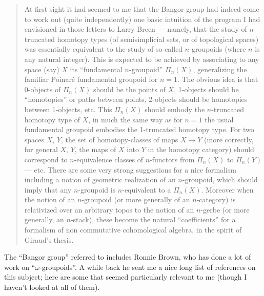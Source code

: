 \documentclass{article}
\begin{document}
\begin{quote}
At first sight it had seemed to me that the Bangor group had indeed come
to work out (quite independently) one basic intuition of the program I
had envisioned in those letters to Larry Breen --- namely, that the
study of \(n\)-truncated homotopy types (of semisimplicial sets, or of
topological spaces) was essentially equivalent to the study of so-called
\(n\)-groupoids (where \(n\) is any natural integer). This is expected
to be achieved by associating to any space (say) \(X\) its ``fundamental
\(n\)-groupoid'' \(\Pi_n(X)\), generalizing the familiar Poinar\'e
fundamental groupoid for \(n = 1\). The obvious idea is that 0-objects
of \(\Pi_n(X)\) should be the points of \(X\), 1-objects should be
``homotopies'' or paths between points, 2-objects should be homotopies
between 1-objects, etc. This \(\Pi_n(X)\) should embody the
\(n\)-truncated homotopy type of \(X\), in much the same way as for
\(n = 1\) the usual fundamental groupoid embodies the 1-truncated
homotopy type. For two spaces \(X\), \(Y\), the set of homotopy-classes
of maps \(X \to Y\) (more correctly, for general \(X\), \(Y\), the maps
of \(X\) into \(Y\) in the homotopy category) should correspond to
\(n\)-equivalence classes of \(n\)-functors from \(\Pi_n(X)\) to
\(\Pi_n(Y)\) --- etc. There are some very strong suggestions for a nice
formalism including a notion of geometric realization of an
\(n\)-groupoid, which should imply that any \(n\)-groupoid is
\(n\)-equivalent to a \(\Pi_n(X)\). Moreover when the notion of an
\(n\)-groupoid (or more generally of an \(n\)-category) is relativized
over an arbitrary topos to the notion of an \(n\)-gerbe (or more
generally, an \(n\)-stack), these become the natural ``coefficients''
for a formalism of non commutative cohomological algebra, in the spirit
of Giraud's thesis.
\end{quote}

The ``Bangor group'' referred to includes Ronnie Brown, who has done a
lot of work on ``\(\omega\)-groupoids''. A while back he sent me a nice
long list of references on this subject; here are some that seemed
particularly relevant to me (though I haven't looked at all of them).
\end{document}
